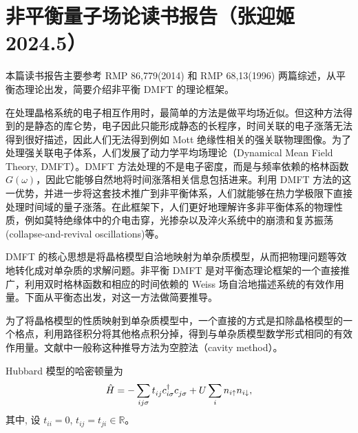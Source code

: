 \chapter*{非平衡量子场论读书报告（张迎姬 2024.5）}
本篇读书报告主要参考 RMP 86,779(2014) 和 RMP 68,13(1996) 两篇综述，从平衡态理论出发，简要介绍非平衡 DMFT 的理论框架。

在处理晶格系统的电子相互作用时，最简单的方法是做平均场近似。但这种方法得到的是静态的库仑势，电子因此只能形成静态的长程序，时间关联的电子涨落无法得到很好描述，因此人们无法得到例如 Mott 绝缘性相关的强关联物理图像。为了处理强关联电子体系，人们发展了动力学平均场理论（Dynamical Mean Field Theory, DMFT）。DMFT 方法处理的不是电子密度，而是与频率依赖的格林函数 $G(\omega)$，因此它能够自然地将时间涨落相关信息包括进来。利用 DMFT 方法的这一优势，并进一步将这套技术推广到非平衡体系，人们就能够在热力学极限下直接处理时间域的量子涨落。在此框架下，人们更好地理解许多非平衡体系的物理性质，例如莫特绝缘体中的介电击穿，光掺杂以及淬火系统中的崩溃和复苏振荡(collapse-and-revival oscillations)等。

DMFT 的核心思想是将晶格模型自洽地映射为单杂质模型，从而把物理问题等效地转化成对单杂质的求解问题。非平衡 DMFT 是对平衡态理论框架的一个直接推广，利用双时格林函数和相应的时间依赖的 Weiss 场自洽地描述系统的有效作用量。下面从平衡态出发，对这一方法做简要推导。

为了将晶格模型的性质映射到单杂质模型中，一个直接的方式是扣除晶格模型的一个格点，利用路径积分将其他格点积分掉，得到与单杂质模型数学形式相同的有效作用量。文献中一般称这种推导方法为空腔法（cavity method）。

Hubbard 模型的哈密顿量为
\begin{equation}
    \hat{H}=-\sum_{ij\sigma}t_{ij}^{ }c_{i\sigma}^\dagger c_{j\sigma}^{ }+U\sum_i n_{i\uparrow} n_{i\downarrow},
\end{equation}
其中, 设 $t_{ii}=0$, $t_{ij}=t_{ji}\in \mathbb{R}$。

